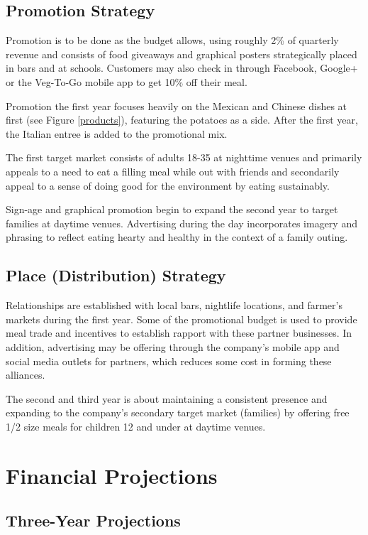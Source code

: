 \documentclass[12pt, letterpaper]{article}
\begin{document}
\subsection{Promotion Strategy}
Promotion is to be done as the budget allows, using roughly 2\% of quarterly revenue and consists of food giveaways and graphical posters strategically placed in bars and at schools.  Customers may also check in through Facebook, Google+ or the Veg-To-Go mobile app to get 10\% off their meal.

Promotion the first year focuses heavily on the Mexican and Chinese dishes at first (see Figure \ref{products}), featuring the potatoes as a side. After the first year, the Italian entree is added to the promotional mix.

The first target market consists of adults 18-35 at nighttime venues and primarily appeals to a need to eat a filling meal while out with friends and secondarily appeal to a sense of doing good for the environment by eating sustainably.

Sign-age and graphical promotion begin to expand the second year to target families at daytime venues.  Advertising during the day incorporates imagery and phrasing to reflect eating hearty and healthy in the context of a family outing.
\subsection{Place (Distribution) Strategy}
Relationships are established with local bars, nightlife locations, and farmer's markets during the first year.  Some of the promotional budget is used to provide meal trade and incentives to establish rapport with these partner businesses.  In addition, advertising may be offering through the company's mobile app and social media outlets for partners, which reduces some cost in forming these alliances.

The second and third year is about maintaining a consistent presence and expanding to the company's secondary target market (families) by offering free 1/2 size meals for children 12 and under at daytime venues.

\section{Financial Projections}
\subsection{Three-Year Projections}
\end{document}
